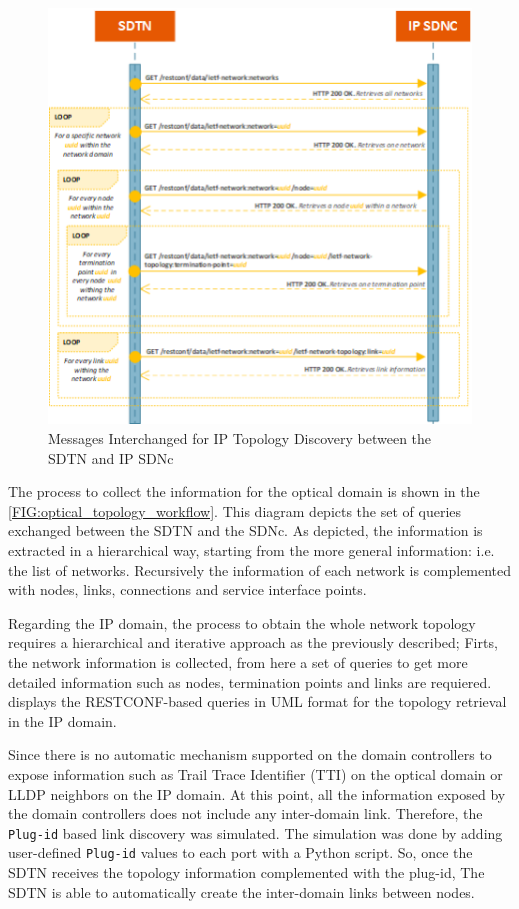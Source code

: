 \documentclass[a4paper,fleqn]{cas-dc}
\begin{document}
\begin{figure}
	\centering
		\includegraphics[width=\linewidth]{figs/ip_topology_workflow.png}
	\caption{Messages Interchanged for IP Topology Discovery between the SDTN and IP SDNc}
	\label{FIG:ip_topology_workflow}
\end{figure}

The process to collect the information for the optical domain is shown in the \cref{FIG:optical_topology_workflow}. This diagram depicts the set of queries exchanged between the SDTN and the SDNc. As depicted, the information is extracted in a hierarchical way, starting from the more general information: i.e. the list of networks.  Recursively the information of each network is complemented with nodes, links, connections and service interface points. 

Regarding the IP domain, the process to obtain the whole network topology requires a hierarchical and iterative approach as the previously described; Firts, the network information is collected, from here a set of queries to get more detailed information such as nodes, termination points and  links are requiered.  displays the RESTCONF-based queries in UML format for the topology retrieval in the IP domain. 


Since there is no automatic mechanism supported on the domain controllers to expose information such as Trail Trace Identifier (TTI) on the optical domain or LLDP neighbors on the IP domain. At this point, all the information exposed by the domain controllers does not include any inter-domain link. Therefore, the \texttt{Plug-id} based link discovery was simulated. The simulation was done by adding user-defined \texttt{Plug-id} values to each port with a Python script. So, once the SDTN receives the topology information complemented with the plug-id, The SDTN is able to automatically create the inter-domain links between nodes.
\end{document}
